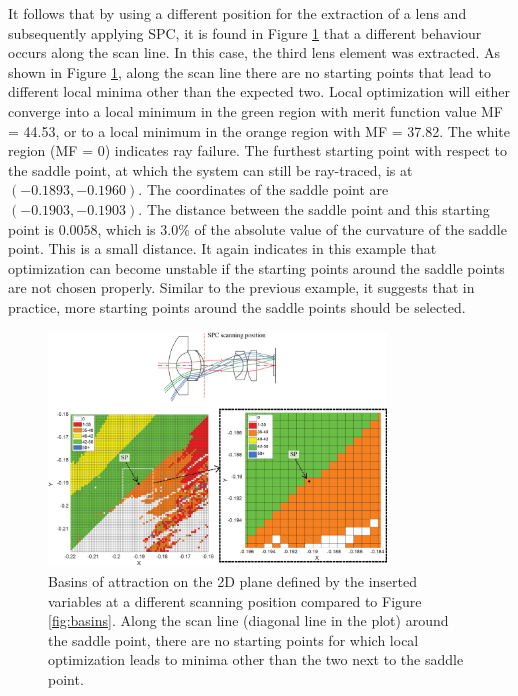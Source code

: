 It follows that by using a different position for the extraction of a lens and subsequently applying SPC, it is found in Figure \ref{fig:basins_WAL_M3_S5} that a different behaviour occurs along the scan line. In this case, the third lens element was extracted. As shown in Figure \ref{fig:basins_WAL_M3_S5}, along the scan line there are no starting points that lead to different local minima other than the expected two. Local optimization will either converge into a local minimum in the green region with merit function value MF = 44.53, or to a local minimum in the orange region with MF = 37.82. The white region (MF = 0) indicates ray failure. The furthest starting point with respect to the saddle point, at which the system can still be ray-traced, is at $(-0.1893, -0.1960)$. The coordinates of the saddle point are $(-0.1903, -0.1903)$. The distance between the saddle point and this starting point is $0.0058$, which is $3.0\%$ of the absolute value of the curvature of the saddle point. This is a small distance. It again indicates in this example that optimization can become unstable if the starting points around the saddle points are not chosen properly. Similar to the previous example, it suggests that in practice, more starting points around the saddle points should be selected. 
\begin{figure}[h!]
    \centering
    \includegraphics[width=0.8\textwidth]{chapter-4/figures/M3-S5_basins.png}
    \caption{Basins of attraction on the 2D plane defined by the inserted variables at a different scanning position compared to Figure \ref{fig:basins}. Along the scan line (diagonal line in the plot) around the saddle point, there are no starting points for which local optimization leads to minima other than the two next to the saddle point.}
    \label{fig:basins_WAL_M3_S5}
\end{figure}
